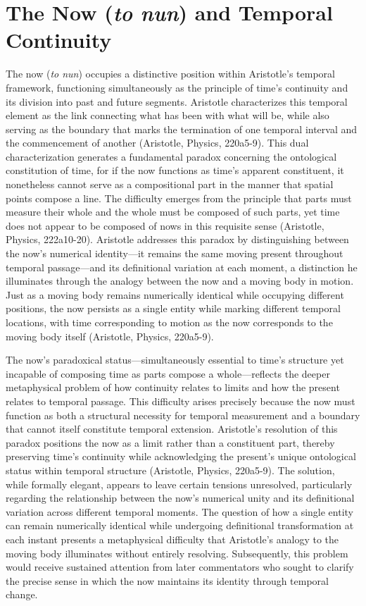 \documentclass[12pt,a4paper]{article}
\begin{document}
\section{The Now (\textit{to nun}) and Temporal Continuity}

The now (\textit{to nun}) occupies a distinctive position within Aristotle's temporal framework, functioning simultaneously as the principle of time's continuity and its division into past and future segments. Aristotle characterizes this temporal element as the link connecting what has been with what will be, while also serving as the boundary that marks the termination of one temporal interval and the commencement of another (Aristotle, Physics, 220a5-9). This dual characterization generates a fundamental paradox concerning the ontological constitution of time, for if the now functions as time's apparent constituent, it nonetheless cannot serve as a compositional part in the manner that spatial points compose a line. The difficulty emerges from the principle that parts must measure their whole and the whole must be composed of such parts, yet time does not appear to be composed of nows in this requisite sense (Aristotle, Physics, 222a10-20). Aristotle addresses this paradox by distinguishing between the now's numerical identity—it remains the same moving present throughout temporal passage—and its definitional variation at each moment, a distinction he illuminates through the analogy between the now and a moving body in motion. Just as a moving body remains numerically identical while occupying different positions, the now persists as a single entity while marking different temporal locations, with time corresponding to motion as the now corresponds to the moving body itself (Aristotle, Physics, 220a5-9).

The now's paradoxical status—simultaneously essential to time's structure yet incapable of composing time as parts compose a whole—reflects the deeper metaphysical problem of how continuity relates to limits and how the present relates to temporal passage. This difficulty arises precisely because the now must function as both a structural necessity for temporal measurement and a boundary that cannot itself constitute temporal extension. Aristotle's resolution of this paradox positions the now as a limit rather than a constituent part, thereby preserving time's continuity while acknowledging the present's unique ontological status within temporal structure (Aristotle, Physics, 220a5-9). The solution, while formally elegant, appears to leave certain tensions unresolved, particularly regarding the relationship between the now's numerical unity and its definitional variation across different temporal moments. The question of how a single entity can remain numerically identical while undergoing definitional transformation at each instant presents a metaphysical difficulty that Aristotle's analogy to the moving body illuminates without entirely resolving. Subsequently, this problem would receive sustained attention from later commentators who sought to clarify the precise sense in which the now maintains its identity through temporal change.
\end{document}
